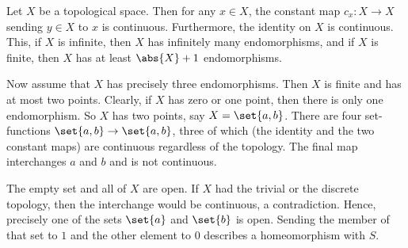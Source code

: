 Let $X$ be a topological space. Then for any $x \in X$, the constant map
$c_x\colon X \to X$ sending $y \in X$ to $x$ is continuous. Furthermore, the
identity on $X$ is continuous. This, if $X$ is infinite, then $X$ has infinitely
many endomorphisms, and if $X$ is finite, then $X$ has at least $\abs{X} + 1$
endomorphisms.

Now assume that $X$
has precisely three endomorphisms. Then $X$ is finite
and has at most two points. Clearly, if $X$ has zero or one point, then there is only
one endomorphism. So $X$ has two points, say  $X = \set{a, b}$. There are four
set-functions $\set{a, b}\to \set{a, b}$, three of which (the identity and the two
constant maps) are continuous regardless of the topology. The final map interchanges
$a$ and $b$ and is not continuous.

The empty set and all of $X$ are open. If $X$ had the trivial or the discrete topology,
then the interchange would be continuous, a contradiction. Hence, precisely one of the
sets $\set{a}$ and $\set{b}$ is open. Sending the member of that set to $1$ and the
other element to $0$ describes a homeomorphism with $S$.
